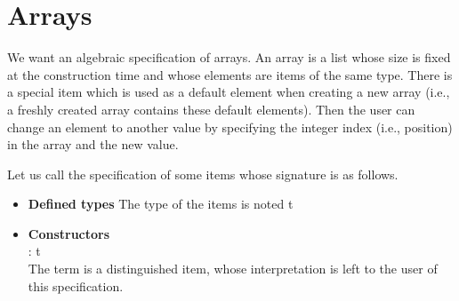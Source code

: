 \documentclass[11pt,a4paper]{article}
\author{Christian Rinderknecht}
\date{17 May 2005}
\newcommand\type[1]{\textsf{#1}}
\begin{document}
\maketitle

\section{Arrays}

We want an algebraic specification of arrays. An array is a list whose
size is fixed at the construction time and whose elements are items of
the same type. There is a special item which is used as a default
element when creating a new array (i.e., a freshly created array
contains these default elements). Then the user can change an element
to another value by specifying the integer index (i.e., position) in
the array and the new value.

\noindent Let us call  the specification of some items whose
signature is as follows.
\begin{itemize}

   \item \textbf{Defined types}
   The type of the items is noted \type{t}

   \item \textbf{Constructors}\\  : \type{t}\\ The term
      is a distinguished item, whose interpretation is
     left to the user of this specification.

\end{itemize}
\end{document}

